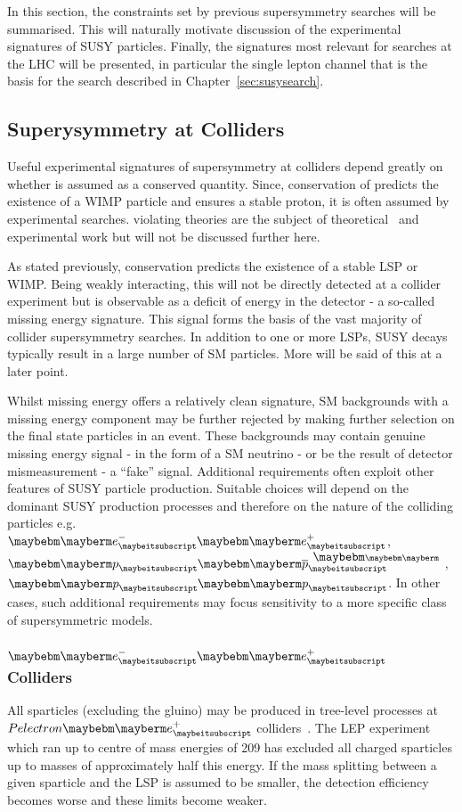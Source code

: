 In this section, the constraints set by previous supersymmetry searches will be
summarised. This will naturally motivate discussion of the experimental
signatures of \ac{SUSY} particles. Finally, the signatures most relevant for
searches at the \ac{LHC} will be presented, in particular the single lepton
channel that is the basis for the search described in
Chapter~\ref{sec:susysearch}.

\subsection{Superysymmetry at Colliders}
Useful experimental signatures of supersymmetry at colliders depend greatly on
whether \Rparity is assumed as a conserved quantity. Since, conservation of
\Rparity predicts the existence of a \ac{WIMP} particle and ensures a stable
proton, it is often assumed by experimental searches. \Rparity violating
theories are the subject of theoretical~\cite{aulakh_rpv} and experimental work
but will not be discussed further here.

As stated previously, \Rparity conservation predicts the existence of a stable
\ac{LSP} or \ac{WIMP}. Being weakly interacting, this will not be directly
detected at a collider experiment but is observable as a deficit of energy in
the detector - a so-called missing energy signature. This signal forms the basis
of the vast majority of collider supersymmetry searches. In addition to one or
more \acp{LSP}, \ac{SUSY} decays typically result in a large number of \ac{SM}
particles. More will be said of this at a later point.

Whilst missing energy offers a relatively clean signature, \ac{SM} backgrounds
with a missing energy component may be further rejected by making further
selection on the final state particles in an event. These backgrounds may
contain genuine missing energy signal - in the form of a \ac{SM} neutrino - or
be the result of detector mismeasurement - a ``fake'' signal. Additional
requirements often exploit other features of \ac{SUSY} particle
production. Suitable choices will depend on the dominant \ac{SUSY} production
processes and therefore on the nature of the colliding particles
e.g. $\Pelectron\APelectron$, $\Pproton\APproton$, $\Pproton\Pproton$. In other
cases, such additional requirements may focus sensitivity to a more specific
class of supersymmetric models.

\subsubsection{$\Pelectron\APelectron$ Colliders}
All sparticles (excluding the gluino) may be produced in tree-level processes at
$Pelectron\APelectron$ colliders~\cite{susy_primer}. The \ac{LEP} experiment
which ran up to centre of mass energies of \unit{209}{\GeV} has excluded all
charged sparticles up to masses of approximately half this energy. If the mass
splitting between a given sparticle and the \ac{LSP} is assumed to be smaller,
the detection efficiency becomes worse and these limits become weaker.

